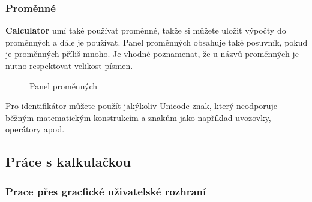 \documentclass[a4paper, 11pt]{article}
\begin{document}
\subsubsection{Proměnné}

\textbf{Calculator} umí také používat proměnné, takže si můžete uložit výpočty do
proměnných a dále je používat. Panel proměnných obsahuje také posuvník,
pokud je proměnných příliš mnoho. Je vhodné poznamenat, že u názvů proměnných je nutno respektovat velikost písmen. 

\begin{figure}[H]
    \centering
    \caption{Panel proměnných}
\end{figure}

Pro identifikátor můžete použít jakýkoliv Unicode znak, který neodporuje
běžným matematickým konstrukcím a znakům jako například uvozovky, operátory apod.

\subsection{Práce s kalkulačkou}

\subsubsection {Prace přes gracfické uživatelské rozhraní}
\end{document}
